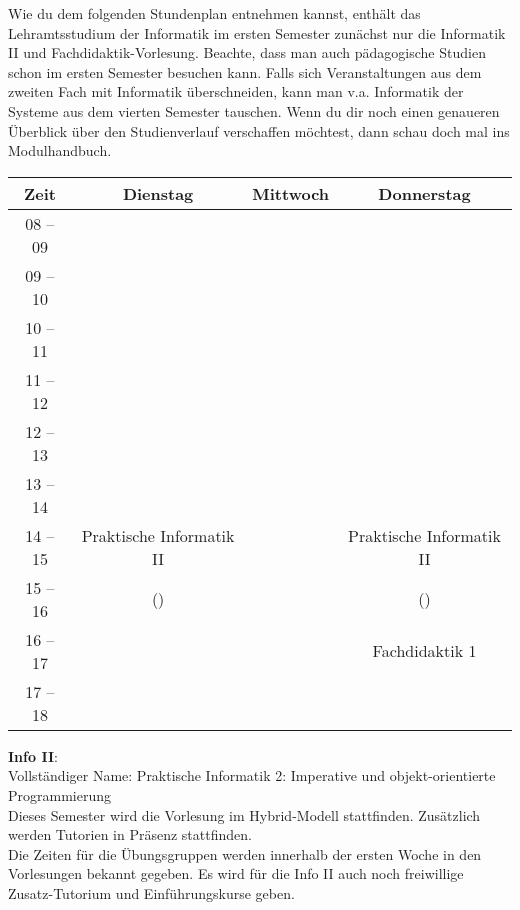 Wie du dem folgenden Stundenplan entnehmen kannst, enthält das Lehramtsstudium der Informatik im ersten Semester zunächst nur die Informatik II und Fachdidaktik-Vorlesung.
Beachte, dass man auch pädagogische Studien schon im ersten Semester besuchen kann. Falls sich Veranstaltungen aus dem zweiten
Fach mit Informatik überschneiden, kann man v.a. Informatik der Systeme aus dem vierten Semester tauschen.
Wenn du dir noch einen genaueren Überblick über den Studienverlauf verschaffen möchtest, dann schau doch mal ins Modulhandbuch.

\begin{center}
	\begin{tabular}{|c|c|c|c|}
		\hline
		Zeit     & Dienstag                   & Mittwoch & Donnerstag               \\ \hline
		08 -- 09 &                            &          &                          \\ \hline
		09 -- 10 &                            &          &                          \\ \hline
		10 -- 11 &                            &          &                          \\ \hline
		11 -- 12 &                            &          &                          \\ \hline
		12 -- 13 &                            &          &                          \\ \hline
		13 -- 14 &                            &          &                          \\ \hline
		14 -- 15 & Praktische Informatik II   &          & Praktische Informatik II \\ \cline{1-1}
		15 -- 16 & (\Infoprof)                &          & (\Infoprof)              \\ \hline
		16 -- 17 &                            &          & Fachdidaktik 1           \\ \hline
		17 -- 18 &                            &          &                          \\ \hline
		\end{tabular}

\end{center}

\textbf{Info II}:\\
Vollständiger Name: Praktische Informatik 2: Imperative und objekt-orientierte Programmierung\\
Dieses Semester wird die Vorlesung im Hybrid-Modell stattfinden. Zusätzlich werden Tutorien in Präsenz stattfinden.\\
Die Zeiten für die Übungsgruppen werden innerhalb der ersten Woche in den Vorlesungen bekannt gegeben.
Es wird für die Info II auch noch freiwillige Zusatz-Tutorium und Einführungskurse geben. 
